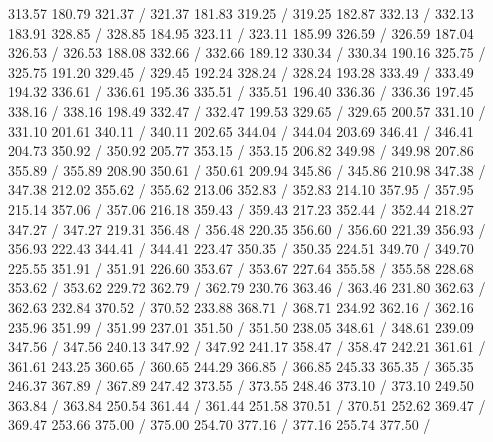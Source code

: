 { 313.57 180.79 321.37 /
 321.37 181.83 319.25 /
 319.25 182.87 332.13 /
 332.13 183.91 328.85 /
 328.85 184.95 323.11 /
 323.11 185.99 326.59 /
 326.59 187.04 326.53 /
 326.53 188.08 332.66 /
 332.66 189.12 330.34 /
 330.34 190.16 325.75 /
 325.75 191.20 329.45 /
 329.45 192.24 328.24 /
 328.24 193.28 333.49 /
 333.49 194.32 336.61 /
 336.61 195.36 335.51 /
 335.51 196.40 336.36 /
 336.36 197.45 338.16 /
 338.16 198.49 332.47 /
 332.47 199.53 329.65 /
 329.65 200.57 331.10 /
 331.10 201.61 340.11 /
 340.11 202.65 344.04 /
 344.04 203.69 346.41 /
 346.41 204.73 350.92 /
 350.92 205.77 353.15 /
 353.15 206.82 349.98 /
 349.98 207.86 355.89 /
 355.89 208.90 350.61 /
 350.61 209.94 345.86 /
 345.86 210.98 347.38 /
 347.38 212.02 355.62 /
 355.62 213.06 352.83 /
 352.83 214.10 357.95 /
 357.95 215.14 357.06 /
 357.06 216.18 359.43 /
 359.43 217.23 352.44 /
 352.44 218.27 347.27 /
 347.27 219.31 356.48 /
 356.48 220.35 356.60 /
 356.60 221.39 356.93 /
 356.93 222.43 344.41 /
 344.41 223.47 350.35 /
 350.35 224.51 349.70 /
 349.70 225.55 351.91 /
 351.91 226.60 353.67 /
 353.67 227.64 355.58 /
 355.58 228.68 353.62 /
 353.62 229.72 362.79 /
 362.79 230.76 363.46 /
 363.46 231.80 362.63 /
 362.63 232.84 370.52 /
 370.52 233.88 368.71 /
 368.71 234.92 362.16 /
 362.16 235.96 351.99 /
 351.99 237.01 351.50 /
 351.50 238.05 348.61 /
 348.61 239.09 347.56 /
 347.56 240.13 347.92 /
 347.92 241.17 358.47 /
 358.47 242.21 361.61 /
 361.61 243.25 360.65 /
 360.65 244.29 366.85 /
 366.85 245.33 365.35 /
 365.35 246.37 367.89 /
 367.89 247.42 373.55 /
 373.55 248.46 373.10 /
 373.10 249.50 363.84 /
 363.84 250.54 361.44 /
 361.44 251.58 370.51 /
 370.51 252.62 369.47 /
 369.47 253.66 375.00 /
 375.00 254.70 377.16 /
 377.16 255.74 377.50 /
}
